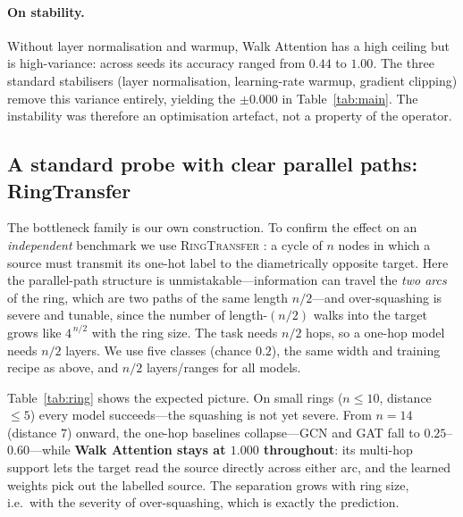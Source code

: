 \paragraph{On stability.}
Without layer normalisation and warmup, Walk Attention has a high ceiling but is
high-variance: across seeds its accuracy ranged from $0.44$ to $1.00$. The three
standard stabilisers (layer normalisation, learning-rate warmup, gradient
clipping) remove this variance entirely, yielding the $\pm0.000$ in
Table~\ref{tab:main}. The instability was therefore an optimisation artefact, not
a property of the operator.

\subsection{A standard probe with clear parallel paths: RingTransfer}

The bottleneck family is our own construction. To confirm the effect on an
\emph{independent} benchmark we use \textsc{RingTransfer}
\cite{digiovanni2023oversquashing}: a cycle of $n$ nodes in which a source must
transmit its one-hot label to the diametrically opposite target. Here the
parallel-path structure is unmistakable---information can travel the \emph{two
arcs} of the ring, which are two paths of the same length $n/2$---and
over-squashing is severe and tunable, since the number of length-$(n/2)$ walks
into the target grows like $4^{\,n/2}$ with the ring size. The task needs $n/2$
hops, so a one-hop model needs $n/2$ layers. We use five classes (chance $0.2$),
the same width and training recipe as above, and $n/2$ layers/ranges for all
models.

Table~\ref{tab:ring} shows the expected picture. On small rings ($n\le 10$,
distance $\le 5$) every model succeeds---the squashing is not yet severe. From
$n=14$ (distance $7$) onward, the one-hop baselines collapse---GCN and GAT fall to
$0.25$--$0.60$---while \textbf{Walk Attention stays at $1.000$ throughout}: its
multi-hop support lets the target read the source directly across either arc, and
the learned weights pick out the labelled source. The separation grows with ring
size, i.e.\ with the severity of over-squashing, which is exactly the prediction.

